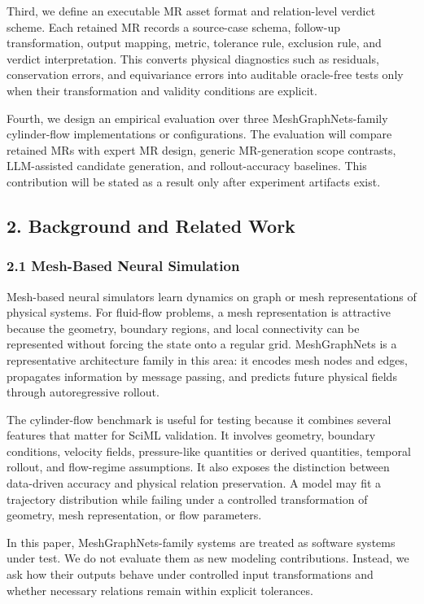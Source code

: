 Third, we define an executable MR asset format and relation-level
verdict scheme. Each retained MR records a source-case schema, follow-up
transformation, output mapping, metric, tolerance rule, exclusion rule,
and verdict interpretation. This converts physical diagnostics such as
residuals, conservation errors, and equivariance errors into auditable
oracle-free tests only when their transformation and validity conditions
are explicit.

Fourth, we design an empirical evaluation over three
MeshGraphNets-family cylinder-flow implementations or configurations.
The evaluation will compare retained MRs with expert MR design, generic
MR-generation scope contrasts, LLM-assisted candidate generation, and
rollout-accuracy baselines. This contribution will be stated as a result
only after experiment artifacts exist.

\subsection{2. Background and Related
Work}\label{background-and-related-work}

\subsubsection{2.1 Mesh-Based Neural
Simulation}\label{mesh-based-neural-simulation}

Mesh-based neural simulators learn dynamics on graph or mesh
representations of physical systems. For fluid-flow problems, a mesh
representation is attractive because the geometry, boundary regions, and
local connectivity can be represented without forcing the state onto a
regular grid. MeshGraphNets is a representative architecture family in
this area: it encodes mesh nodes and edges, propagates information by
message passing, and predicts future physical fields through
autoregressive rollout.

The cylinder-flow benchmark is useful for testing because it combines
several features that matter for SciML validation. It involves geometry,
boundary conditions, velocity fields, pressure-like quantities or
derived quantities, temporal rollout, and flow-regime assumptions. It
also exposes the distinction between data-driven accuracy and physical
relation preservation. A model may fit a trajectory distribution while
failing under a controlled transformation of geometry, mesh
representation, or flow parameters.

In this paper, MeshGraphNets-family systems are treated as software
systems under test. We do not evaluate them as new modeling
contributions. Instead, we ask how their outputs behave under controlled
input transformations and whether necessary relations remain within
explicit tolerances.

